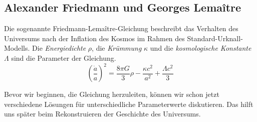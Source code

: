 \begin{refsection}
 
\section{Alexander Friedmann und Georges Lema\^{i}tre}
Die sogenannte Friedmann-Lema\^{i}tre-Gleichung beschreibt das Verhalten des Universums nach der Inflation des Kosmos im Rahmen des Standard-Urknall-Modells. Die {\em Energiedichte} $\rho$, die {\em Krümmung} $\kappa$ und die {\em kosmologische Konstante} $\Lambda$ sind die Parameter der Gleichung.
\begin{equation}
\left(\frac{\dot{a}}{a}\right) ^2 = \frac{8 \pi G}{3} \rho - \frac{\kappa c^2}{a^2} + \frac{\Lambda c^2}{3}
\end{equation}

Bevor wir beginnen, die Gleichung herzuleiten, können wir schon jetzt verschiedene Lösungen für unterschiedliche Parameterwerte diskutieren. Das hilft uns später beim Rekonstruieren der Geschichte des Universums.


\end{refsection}
